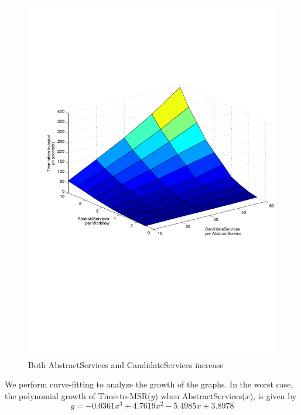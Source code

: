 \documentclass[10pt,journal,compsoc]{IEEEtran}
\begin{document}
\begin{figure}[htbp]
	\centering
	\includegraphics[clip, trim=1cm 10cm 1cm 7cm,scale=0.47]{graphs/scaling_time_task_candidates.pdf}
	\caption{Both AbstractServices and CandidateServices increase \label{fig:task_and_candidate_scaling}}
\end{figure}
% 
We perform curve-fitting to analyze the growth of the graphs. In the worst case, the polynomial growth of Time-to-MSR($y$) when AbstractServices($x$), is given by
\begin{equation}
    y =  -0.0361x^{3} +   4.7619x^{2}  - 5.4985x +   3.8978 \label{eq:task_vs_cand}
\end{equation}
\end{document}
